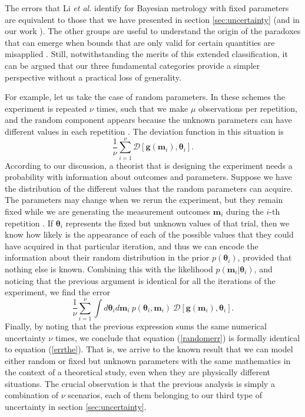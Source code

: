 The errors that Li \emph{et al.} identify for Bayesian metrology with fixed parameters are equivalent to those that we have presented in section \ref{sec:uncertainty} (and in our work \cite{jesus2017}). The other groups are useful to understand the origin of the paradoxes that can emerge when bounds that are only valid for certain quantities are misapplied \cite{li2018}. Still, notwithstanding the merits of this extended classification, it can be argued that our three fundamental categories provide a simpler perspective without a practical loss of generality.

For example, let us take the case of random parameters. In these schemes the experiment is repeated $\nu$ times, such that we make $\mu$ observations per repetition, and the random component appears because the unknown parameters can have different values in each repetition \cite{li2018}. The deviation function in this situation is \cite{martinezvargas2019}
\begin{equation}
\frac{1}{\nu} \sum_{i = 1}^\nu \mathcal{D}\left[\boldsymbol{g}(\boldsymbol{m}_i), \boldsymbol{\theta}_i \right].
\end{equation}
According to our discussion, a theorist that is designing the experiment needs a probability with information about outcomes and parameters. Suppose we have the distribution of the different values that the random parameters can acquire. The parameters may change when we rerun the experiment, but they remain fixed while we are generating the measurement outcomes $\boldsymbol{m}_i$ during the $i$-th repetition \cite{li2018}. If $\boldsymbol{\theta}_i$ represents the fixed but unknown values of that trial, then we know how likely is the appearance of each of the possible values that they could have acquired in that particular iteration, and thus we can encode the information about their random distribution in the prior $p(\boldsymbol{\theta}_i)$, provided that nothing else is known. Combining this with the likelihood $p(\boldsymbol{m}_i|\boldsymbol{\theta}_i)$, and noticing that the previous argument is identical for all the iterations of the experiment, we find the error
\begin{equation}
\frac{1}{\nu} \sum_{i = 1}^\nu \int d\boldsymbol{\theta}_i d\boldsymbol{m}_i ~ p(\boldsymbol{\theta}_i, \boldsymbol{m}_i) ~\mathcal{D}\left[\boldsymbol{g}(\boldsymbol{m}_i), \boldsymbol{\theta}_i \right].
\label{randomerr}
\end{equation}
Finally, by noting that the previous expression sums the same numerical uncertainty $\nu$ times, we conclude that equation (\ref{randomerr}) is formally identical to equation (\ref{errthe}). That is, we arrive to the known result that we can model either random or fixed but unknown parameters with the same mathematics in the context of a theoretical study, even when they are physically different situations. The crucial observation is that the previous analysis is simply a combination of $\nu$ scenarios, each of them belonging to our third type of uncertainty in section \ref{sec:uncertainty}.  


